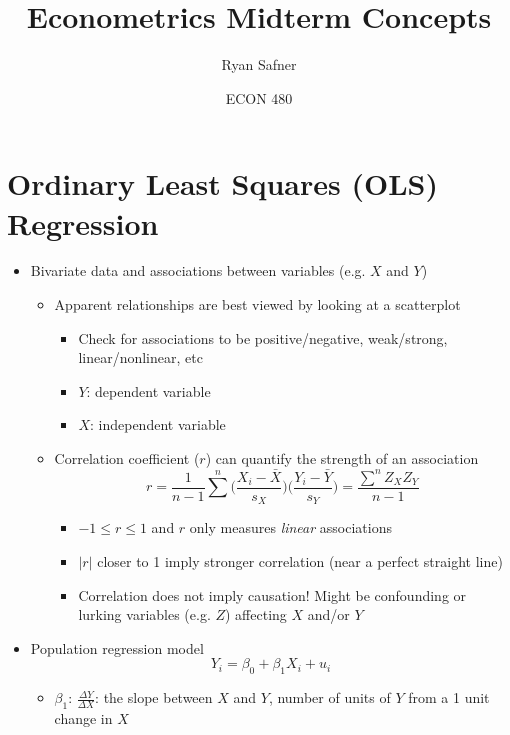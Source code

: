 \documentclass{article}
\title{Econometrics Midterm Concepts}
\author{Ryan Safner}
\date{ECON 480}
\begin{document}
	
\maketitle

\section*{Ordinary Least Squares (OLS) Regression}

\begin{itemize}
	\item	Bivariate data and associations between variables (e.g. $X$ and $Y$)
	\begin{itemize}
		\item Apparent relationships are best viewed by looking at a scatterplot
		\begin{itemize}
			\item Check for associations to be positive/negative, weak/strong, linear/nonlinear, etc
			\item $Y$: dependent variable
			\item $X$: independent variable 
		\end{itemize}
		\item Correlation coefficient ($r$) can quantify the strength of an association
		\begin{equation*}
					r=\frac{1}{n-1} \sum^n \bigg(\frac{X_i-\bar{X}}{s_X}\bigg) \bigg(\frac{Y_i-\bar{Y}}{s_Y}\bigg) = \frac{\displaystyle \sum^n Z_X Z_Y}{n-1}	
		\end{equation*}
		\begin{itemize}
			\item $-1 \leq r \leq 1$ and $r$ only measures \emph{linear} associations
			\item $|r|$ closer to 1 imply stronger correlation (near a perfect straight line)  
			\item Correlation does not imply causation! Might be confounding or lurking variables (e.g. $Z$) affecting $X$ and/or $Y$
		\end{itemize}
	\end{itemize}
	\item Population regression model
	\begin{equation*}
Y_i=\beta_0+\beta_1X_i+u_i
	\end{equation*}
	\begin{itemize}
		\item $\beta_1$: $\frac{\Delta Y}{\Delta X}$: the slope between $X$ and $Y$, number of units of $Y$ from a 1 unit change in $X$ 

\end{itemize}
\end{itemize}
\end{document}
